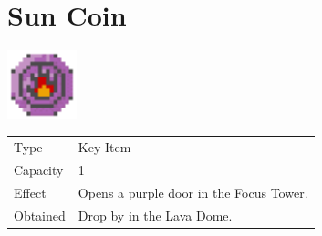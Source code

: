 \section{Sun Coin}
\label{item:sun_coin}

\includegraphics[height=2cm,keepaspectratio]{./resources/items/suncoin}

\begin{longtable}{ l p{9cm} }
	Type
	& Key Item
\\ %
	Capacity
	& 1
\\ %
	Effect
	& Opens a purple door in the Focus Tower.
\\ %
	Obtained
	& Drop by \nameref{monster:dualhead_hydra} in the Lava Dome.
\end{longtable}
